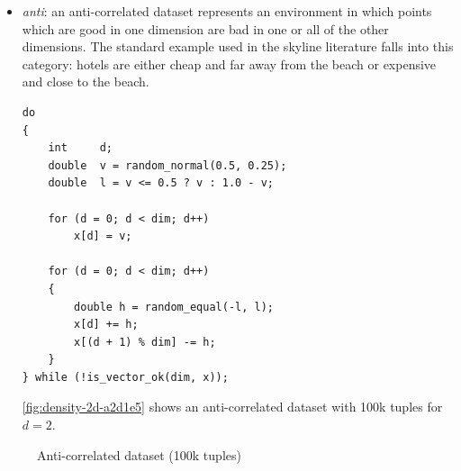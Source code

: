 \begin{itemize}
\vfill
\pagebreak[4]

\enlargethispage{\baselineskip}

\item \emph{anti}:
an anti-correlated dataset represents an environment in which points
which are good in one dimension are bad in one or all of the other
dimensions. The standard example used in the skyline literature falls
into this category: hotels are either cheap and far away from the
beach or expensive and close to the beach.
%
\medskip
\begin{lstlisting}
do
{
	int		d;
	double	v = random_normal(0.5, 0.25);
	double	l = v <= 0.5 ? v : 1.0 - v;
			
	for (d = 0; d < dim; d++)
		x[d] = v;
		
	for (d = 0; d < dim; d++)
	{
		double h = random_equal(-l, l);
		x[d] += h;
		x[(d + 1) % dim] -= h;
	}
} while (!is_vector_ok(dim, x));
\end{lstlisting}
\medskip
%
\autoref{fig:density-2d-a2d1e5} shows an anti-correlated dataset
with 100k tuples for $d = 2$.
\end{itemize}

\begin{figure}[htbp]
\centering
{}%
%
\caption{Anti-correlated dataset (100k tuples)}%
\label{fig:density-2d-a2d1e5}%
\end{figure}

